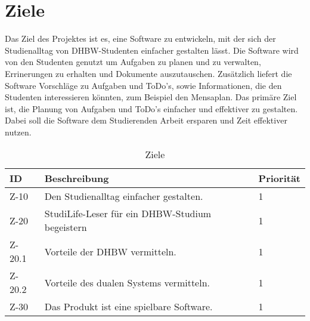
\chapter{Ziele}
Das Ziel des Projektes ist es, eine Software zu entwickeln, mit der sich der Studienalltag von DHBW-Studenten einfacher gestalten lässt. Die Software wird von den Studenten genutzt um  Aufgaben zu planen und zu verwalten, Errinerungen zu erhalten und Dokumente auszutauschen. Zusätzlich liefert die Software Vorschläge zu Aufgaben und ToDo's, sowie Informationen, die den Studenten interessieren könnten, zum Beispiel den Mensaplan. Das primäre Ziel ist, die Planung von Aufgaben und ToDo's einfacher und effektiver zu gestalten. Dabei soll die Software dem Studierenden Arbeit ersparen und Zeit effektiver nutzen.

\begin{table}[H]
\caption{Ziele}
\label{ziele:entwicklungsziele}
\begin{tabularx}{\textwidth}{|l|X|l|}
\toprule
\textbf{ID} & \textbf{Beschreibung} & \textbf{Priorität}\\
\endhead
\hline
Z-10 & Den Studienalltag einfacher gestalten. & 1 \\
Z-20 & StudiLife-Leser für ein DHBW-Studium begeistern & 1 \\
Z-20.1 & Vorteile der DHBW vermitteln. & 1 \\
Z-20.2 & Vorteile des dualen Systems vermitteln. & 1 \\
Z-30 & Das Produkt ist eine spielbare Software. & 1\\
\hline
\end{tabularx}
\end{table}
